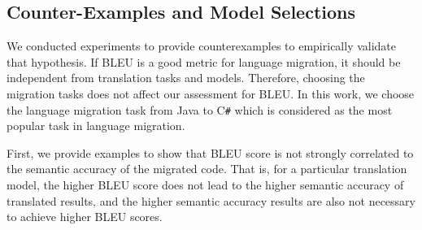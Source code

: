 \subsection{Counter-Examples and Model Selections}



We conducted experiments to provide counterexamples to empirically
validate that hypothesis. If BLEU is a good metric for language migration, 
it should be independent from translation tasks and models. Therefore, 
choosing the migration tasks does not affect our assessment for BLEU. 
In this work, we choose the language migration task from Java to C\texttt{\#} 
which is considered as the most popular task in language migration.

%
%
First, we provide examples to show that BLEU score is not strongly correlated to the 
semantic accuracy of the migrated code. That is, for a particular 
translation model, the higher BLEU score does not lead to the higher semantic 
accuracy of translated results, and the higher semantic accuracy results 
are also not necessary to achieve higher BLEU scores.
%
%
%


